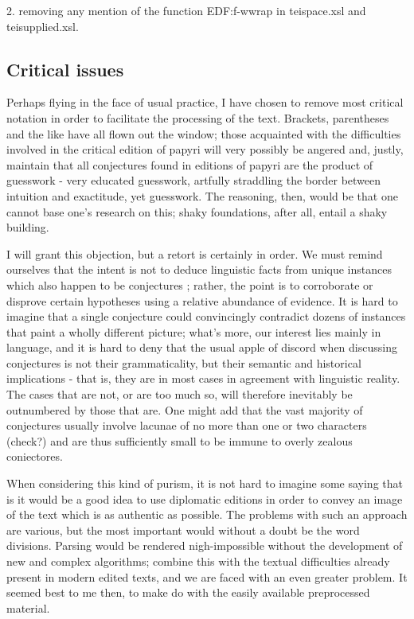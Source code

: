 2. removing any mention of the function EDF:f-wwrap in teispace.xsl and
teisupplied.xsl.

\subsection{Critical issues}
\label{subsect:criticalissues}

Perhaps flying in the face of usual practice, I have chosen to remove
most critical notation in order to facilitate the processing of the
text. Brackets, parentheses and the like have all flown out the window;
those acquainted with the difficulties involved in the critical edition
of papyri will very possibly be angered and, justly, maintain that
all conjectures found in editions of papyri are the
product of guesswork - very educated guesswork, artfully straddling the border
between intuition and exactitude, yet guesswork. The
reasoning, then, would be that one cannot base one's research on this;
shaky foundations, after all, entail a shaky building.

I will grant this objection, but a retort is certainly in order. We must
remind ourselves that the intent is not to deduce linguistic facts from
unique instances which also happen to be conjectures ; rather, the
point is to corroborate or disprove certain hypotheses using a relative
abundance of evidence. It is hard to imagine that a single conjecture
could convincingly contradict dozens of instances that paint a wholly
different picture; what's more, our interest lies mainly in language,
and it is hard to deny that the usual apple of discord when discussing
conjectures is not their grammaticality, but their semantic and
historical implications - that is, they are in most cases in agreement
with linguistic reality. The cases that are not, or are too much so,
will therefore inevitably be outnumbered by those that are. One might
add that the vast majority of conjectures usually involve lacunae of no
more than one or two characters (check?) and are thus sufficiently small
to be immune to overly zealous coniectores.

When considering this kind of purism, it is not hard to imagine some
saying that is it would be a good idea to use diplomatic editions in
order to convey an image of the text which is as authentic as possible.
The problems with such an approach are various, but the most important
would without a doubt be the word divisions. Parsing would be rendered
nigh-impossible without the development of new and complex algorithms;
combine this with the textual difficulties already present in modern edited
texts, and we are faced with an even greater problem. It seemed best to
me then, to make do with the easily available preprocessed material.


